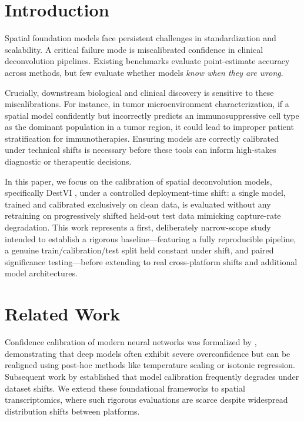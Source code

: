 \documentclass[pmlr,twocolumn,10pt]{jmlr} %
\begin{document}
\section{Introduction}
\label{sec:intro}
Spatial foundation models face persistent challenges in standardization and scalability. A critical failure mode is miscalibrated confidence in clinical deconvolution pipelines. Existing benchmarks evaluate point-estimate accuracy across methods, but few evaluate whether models \textit{know when they are wrong}. 

Crucially, downstream biological and clinical discovery is sensitive to these miscalibrations. For instance, in tumor microenvironment characterization, if a spatial model confidently but incorrectly predicts an immunosuppressive cell type as the dominant population in a tumor region, it could lead to improper patient stratification for immunotherapies. Ensuring models are correctly calibrated under technical shifts is necessary before these tools can inform high-stakes diagnostic or therapeutic decisions.

In this paper, we focus on the calibration of spatial deconvolution models, specifically DestVI \citep{lopez2022destvi}, under a controlled deployment-time shift: a single model, trained and calibrated exclusively on clean data, is evaluated without any retraining on progressively shifted held-out test data mimicking capture-rate degradation. This work represents a first, deliberately narrow-scope study intended to establish a rigorous baseline—featuring a fully reproducible pipeline, a genuine train/calibration/test split held constant under shift, and paired significance testing—before extending to real cross-platform shifts and additional model architectures.

\section{Related Work}
\label{sec:related}
Confidence calibration of modern neural networks was formalized by \citet{guo2017calibration}, demonstrating that deep models often exhibit severe overconfidence but can be realigned using post-hoc methods like temperature scaling or isotonic regression. Subsequent work by \citet{ovadia2019can} established that model calibration frequently degrades under dataset shifts. We extend these foundational frameworks to spatial transcriptomics, where such rigorous evaluations are scarce despite widespread distribution shifts between platforms.
\end{document}

